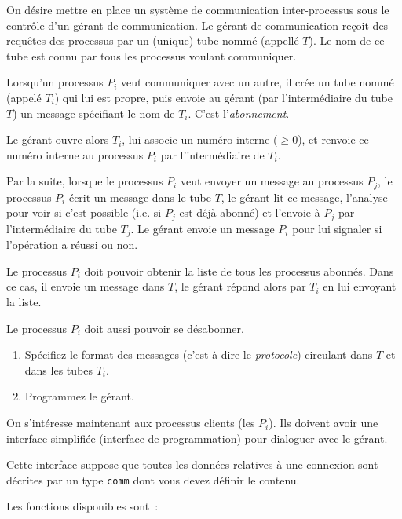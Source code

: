 \question

On désire mettre en place un système de communication inter-processus
sous le contrôle d'un gérant de communication.  Le gérant de
communication reçoit des requêtes des processus par un (unique) tube
nommé (appellé $T$). Le nom de ce tube est connu par tous les processus
voulant communiquer.

Lorsqu'un processus $P_i$ veut communiquer avec un autre, il crée un
tube nommé (appelé $T_i$) qui lui est propre, puis envoie au gérant (par
l'intermédiaire du tube $T$) un message spécifiant le nom de $T_i$.
C'est l'{\em abonnement}.

Le gérant ouvre alors $T_i$, lui associe un numéro interne ($\geq 0$),
et renvoie ce numéro interne au processus $P_i$ par l'intermédiaire de
$T_i$.

Par la suite, lorsque le processus $P_i$ veut envoyer un message au
processus $P_j$, le processus $P_i$ écrit un message dans le tube $T$,
le gérant lit ce message, l'analyse pour voir si c'est possible (i.e.
si $P_j$ est déjà abonné) et l'envoie à $P_j$ par l'intermédiaire du
tube $T_j$. Le gérant envoie un message $P_i$ pour lui signaler si
l'opération a réussi ou non.

Le processus $P_i$ doit pouvoir obtenir la liste de tous les processus
abonnés. Dans ce cas, il envoie un message dans $T$, le gérant répond
alors par $T_i$ en lui envoyant la liste.

Le processus $P_i$ doit aussi pouvoir se désabonner.

\begin {enumerate}
    \item Spécifiez le format des messages (c'est-à-dire le {\em
	protocole}) circulant dans $T$ et dans les tubes $T_i$.

    \item Programmez le gérant.

\end {enumerate}


\question

On s'intéresse maintenant aux processus clients (les $P_i$). Ils
doivent avoir une interface simplifiée (interface de programmation)
pour dialoguer avec le gérant.

Cette interface suppose que toutes les données relatives à une
connexion sont décrites par un type {\tt comm} dont vous devez
définir le contenu.

Les fonctions disponibles sont~:

